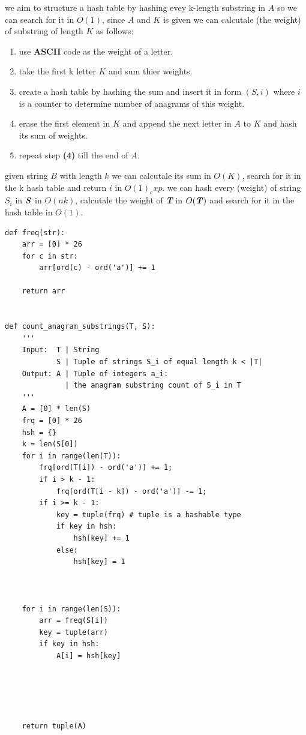 \documentclass[12pt,twoside]{article}
\begin{document}
\begin{problems}
\begin{problemparts}
\problempart %
  we aim to structure a hash table by hashing evey k-length substring in $A$ so we can search for it in $O(1)$, 
  since $A$ and $K$ is given we can calcutale (the weight) of substring of length $K$ as follows: 
  \begin{enumerate}
    \item use \textbf{ASCII} code as the weight of a letter. 
    \item take the first k letter $K$ and sum thier weights. 
    \item create a hash table by hashing the sum and insert it in form $(S, i)$ where $i$ is a counter
      to determine number of anagrams of this weight.
    \item erase the first element in $K$ and append the next letter in $A$ to $K$ and hash its sum of weights. 
    \item repeat step \textbf{(4)} till the end of $A$.
  \end{enumerate}
  given string $B$ with length $k$ we can calcutale its sum in $O(K)$, search for it in the 
  k  hash table and return $i$ in $O(1)_exp$.
\problempart %
  we can hash every (weight) of string $S_i$ in $\textbf{\textit{S}}$ in $O(nk)$, calcutale the weight of \textbf{\textit{T}}
  in $O(\textbf{\textit{T}})$ and search for it in the hash table in $O(1)$.
  \newpage
\problempart 
\begin{lstlisting}
def freq(str):
    arr = [0] * 26
    for c in str:
        arr[ord(c) - ord('a')] += 1
    
    return arr


def count_anagram_substrings(T, S):
    '''
    Input:  T | String
            S | Tuple of strings S_i of equal length k < |T|
    Output: A | Tuple of integers a_i:
              | the anagram substring count of S_i in T
    '''
    A = [0] * len(S) 
    frq = [0] * 26
    hsh = {}
    k = len(S[0])
    for i in range(len(T)):
        frq[ord(T[i]) - ord('a')] += 1;
        if i > k - 1:
            frq[ord(T[i - k]) - ord('a')] -= 1;
        if i >= k - 1:
            key = tuple(frq) # tuple is a hashable type
            if key in hsh:
                hsh[key] += 1 
            else:
                hsh[key] = 1 

    
        
    for i in range(len(S)):
        arr = freq(S[i])
        key = tuple(arr)
        if key in hsh:
            A[i] = hsh[key]


                
    

    return tuple(A)

\end{lstlisting}
\end{problemparts}

\end{problems}
\end{document}
